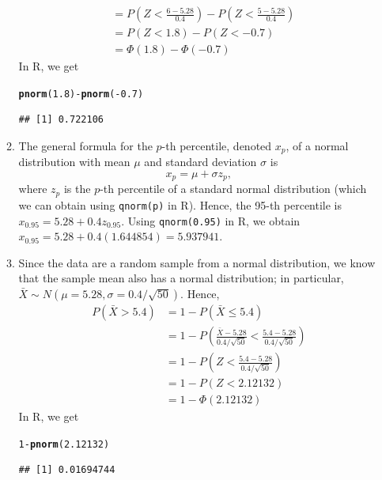 \documentclass{article}\usepackage[]{graphicx}\usepackage[]{color}
\makeatletter
\newcommand{\hlnum}[1]{\textcolor[rgb]{0.686,0.059,0.569}{#1}}%
\newcommand{\hlopt}[1]{\textcolor[rgb]{0,0,0}{#1}}%
\newcommand{\hlstd}[1]{\textcolor[rgb]{0.345,0.345,0.345}{#1}}%
\newcommand{\hlkwd}[1]{\textcolor[rgb]{0.737,0.353,0.396}{\textbf{#1}}}%
\newenvironment{kframe}{%
 \def\at@end@of@kframe{}%
 \ifinner\ifhmode%
  \def\at@end@of@kframe{\end{minipage}}%
  \begin{minipage}{\columnwidth}%
 \fi\fi%
 \def\FrameCommand##1{\hskip\@totalleftmargin \hskip-\fboxsep
 \colorbox{shadecolor}{##1}\hskip-\fboxsep
     \hskip-\linewidth \hskip-\@totalleftmargin \hskip\columnwidth}%
 \MakeFramed {\advance\hsize-\width
   \@totalleftmargin\z@ \linewidth\hsize
   \@setminipage}}%
 {\par\unskip\endMakeFramed%
 \at@end@of@kframe}
\newenvironment{knitrout}{}{} %
\makeatother
\begin{document}
\begin{enumerate}
\begin{enumerate}
\begin{align*}
             &= P\left(Z < \frac{6 - 5.28}{0.4}\right) - P\left(Z < \frac{5 - 5.28}{0.4}\right) \\
             &= P\left(Z < 1.8\right) - P\left(Z < -0.7\right) \\
             &= \Phi\left(1.8\right) - \Phi\left(-0.7\right)
          \end{align*}
          In R, we get
\begin{knitrout}
\color{fgcolor}\begin{kframe}
\begin{alltt}
\hlkwd{pnorm}\hlstd{(}\hlnum{1.8}\hlstd{)} \hlopt{-} \hlkwd{pnorm}\hlstd{(}\hlopt{-}\hlnum{0.7}\hlstd{)}
\end{alltt}
\begin{verbatim}
## [1] 0.722106
\end{verbatim}
\end{kframe}
\end{knitrout}
    \item The general formula for the $p$-th percentile, denoted $x_p$, of a normal distribution with mean $\mu$ and standard deviation $\sigma$ is 
    \begin{equation*}
      x_p = \mu + \sigma z_p, 
    \end{equation*}
    where $z_p$ is the $p$-th percentile of a standard normal distribution (which we can obtain using \texttt{qnorm(p)} in R). Hence, the 95-th percentile is $x_{0.95} = 5.28 + 0.4 z_{0.95}$. Using \texttt{qnorm(0.95)} in R, we obtain $x_{0.95} = 5.28 + 0.4\left(1.644854\right) = 5.937941$.
    \item Since the data are a random sample from a normal distribution, we know that the sample mean also has a normal distribution; in particular, $\bar{X} \sim N\left(\mu = 5.28, \sigma = 0.4 / \sqrt{50}\right)$. Hence,
    \begin{align*}
      P\left(\bar{X} > 5.4\right) &= 1 - P\left(\bar{X} \le 5.4 \right) \\
        &= 1 - P\left(\frac{\bar{X} - 5.28}{0.4 / \sqrt{50}} < \frac{5.4 - 5.28}{0.4 / \sqrt{50}}\right) \\
        &= 1 - P\left(Z < \frac{5.4 - 5.28}{0.4 / \sqrt{50}}\right) \\
        &= 1 - P\left(Z < 2.12132\right) \\
        &= 1 - \Phi\left(2.12132\right)
    \end{align*}
    In R, we get
\begin{knitrout}
\color{fgcolor}\begin{kframe}
\begin{alltt}
\hlnum{1} \hlopt{-} \hlkwd{pnorm}\hlstd{(}\hlnum{2.12132}\hlstd{)}
\end{alltt}
\begin{verbatim}
## [1] 0.01694744
\end{verbatim}
\end{kframe}
\end{knitrout}
  \end{enumerate}
  

\end{enumerate}
\end{document}
